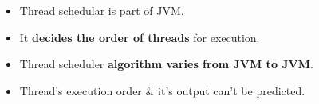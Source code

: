 \setlength{\columnsep}{3pt}
\begin{flushleft}
	
	\begin{itemize}
		\item Thread schedular is part of JVM.
		\item It \textbf{decides the order of threads} for execution.
		\item Thread scheduler \textbf{algorithm varies from JVM to JVM}.
		\item Thread's execution order \& it's output can't be predicted. 
	\end{itemize}
	
\end{flushleft}



